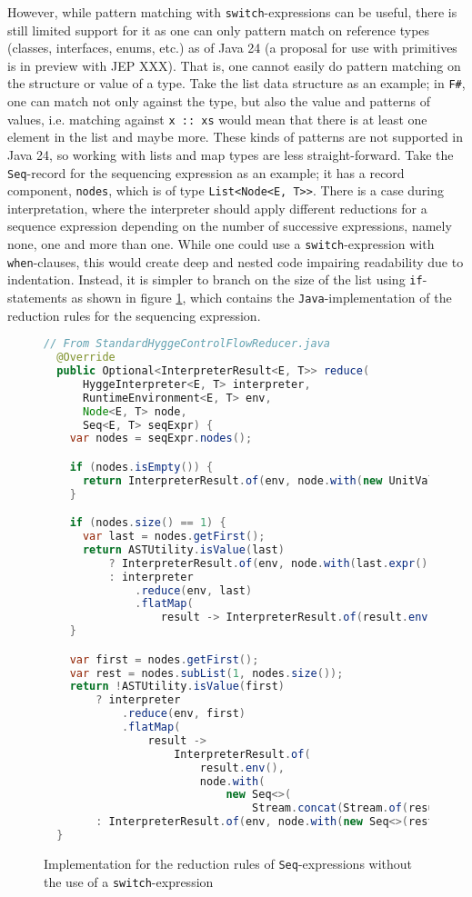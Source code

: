 However, while pattern matching with \texttt{switch}-expressions can be useful, there is still limited support for it as one
can only pattern match on reference types (classes, interfaces, enums, etc.) as of Java 24 (a proposal for use with primitives is in preview with JEP XXX).
That is, one cannot easily do pattern matching on the structure or value of a type. Take the list data structure as an example;
in \texttt{F\#}, one can match not only against the type, but also the value and patterns of values, i.e. matching against \texttt{x :: xs}
would mean that there is at least one element in the list and maybe more. These kinds of patterns are not supported in Java 24, so working with lists and
map types are less straight-forward. Take the \texttt{Seq}-record for the sequencing expression as an example; it has a record component,
\texttt{nodes}, which is of type \texttt{List<Node<E, T>>}. There is a case during interpretation, where the interpreter should apply
different reductions for a sequence expression depending on the number of successive expressions, namely none, one and more than one.
While one could use a \texttt{switch}-expression with \texttt{when}-clauses, this would create deep and nested code impairing readability
due to indentation. Instead, it is simpler to branch on the size of the list using \texttt{if}-statements as shown in figure \ref{fig:seq_reduce_implementation},
which contains the \texttt{Java}-implementation of the reduction rules for the sequencing expression.

\begin{figure}[H]
\centering
\begin{lstlisting}[language=Java]
  // From StandardHyggeControlFlowReducer.java
  @Override
  public Optional<InterpreterResult<E, T>> reduce(
      HyggeInterpreter<E, T> interpreter,
      RuntimeEnvironment<E, T> env,
      Node<E, T> node,
      Seq<E, T> seqExpr) {
    var nodes = seqExpr.nodes();

    if (nodes.isEmpty()) {
      return InterpreterResult.of(env, node.with(new UnitVal<>()));
    }

    if (nodes.size() == 1) {
      var last = nodes.getFirst();
      return ASTUtility.isValue(last)
          ? InterpreterResult.of(env, node.with(last.expr()))
          : interpreter
              .reduce(env, last)
              .flatMap(
                  result -> InterpreterResult.of(result.env(), node.with(result.node().expr())));
    }

    var first = nodes.getFirst();
    var rest = nodes.subList(1, nodes.size());
    return !ASTUtility.isValue(first)
        ? interpreter
            .reduce(env, first)
            .flatMap(
                result ->
                    InterpreterResult.of(
                        result.env(),
                        node.with(
                            new Seq<>(
                                Stream.concat(Stream.of(result.node()), rest.stream()).toList()))))
        : InterpreterResult.of(env, node.with(new Seq<>(rest)));
  }
\end{lstlisting}
\caption{Implementation for the reduction rules of \texttt{Seq}-expressions without the use of a \texttt{switch}-expression}
\label{fig:seq_reduce_implementation}
\end{figure}

